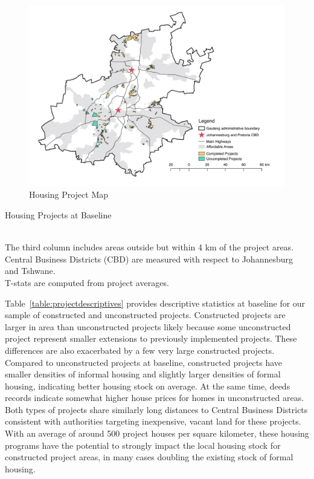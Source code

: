 \documentclass[12pt]{article}
\begin{document}
\begin{figure}
\caption{Housing Project Map}\label{figure:map}
\centering
\includegraphics[scale=.5]{figures/explanmap.jpg}
\end{figure}

\begin{table}
\centering
\caption{Housing Projects at Baseline}\label{table:projectdescriptives}
%
\\
\vspace{.2cm}
\footnotesize{The third column includes areas outside but within 4 km of the project areas. \\ Central Business Districts (CBD) are measured with respect to Johannesburg and Tshwane.  \\ T-stats are computed from project averages.}
\end{table}

Table~\ref{table:projectdescriptives} provides descriptive statistics at baseline for our sample of constructed and unconstructed projects.  Constructed projects are larger in area than unconstructed projects likely because some unconstructed project represent smaller extensions to previously implemented projects.  These differences are also exacerbated by a few very large constructed projects.  Compared to unconstructed projects at baseline, constructed projects have smaller densities of informal housing and slightly larger densities of formal housing, indicating better housing stock on average.  At the same time, deeds records indicate somewhat higher house prices for homes in unconstructed areas.  Both types of projects share similarly long distances to Central Business Districts consistent with authorities targeting inexpensive, vacant land for these projects.  With an average of around 500 project houses per square kilometer, these housing programs have the potential to strongly impact the local housing stock for constructed project areas, in many cases doubling the existing stock of formal housing.
\end{document}
